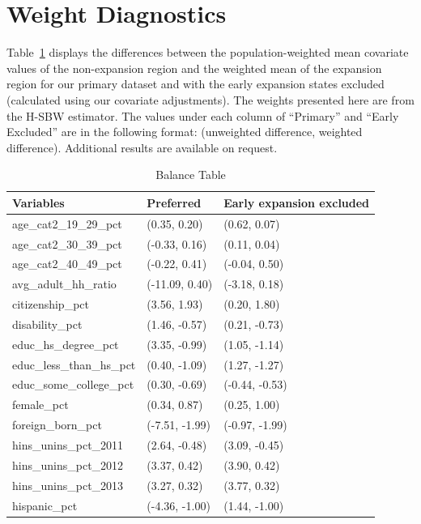 \section{Weight Diagnostics}
\label{ssec:balancetables}

Table~\ref{tab:baltab1} displays the differences between the population-weighted mean covariate values of the non-expansion region and the weighted mean of the expansion region for our primary dataset and with the early expansion states excluded (calculated using our covariate adjustments). The weights presented here are from the H-SBW estimator. The values under each column of ``Primary'' and ``Early Excluded'' are in the following format: (unweighted difference, weighted difference). Additional results are available on request.

\begin{table}[ht]
\centering
    \caption{Balance Table}
    \label{tab:baltab1}
\begin{tabular}{lll}
  \hline
Variables & Preferred & Early expansion excluded \\ 
  \hline
age\_cat2\_19\_29\_pct & (0.35, 0.20) & (0.62, 0.07) \\ 
  age\_cat2\_30\_39\_pct & (-0.33, 0.16) & (0.11, 0.04) \\ 
  age\_cat2\_40\_49\_pct & (-0.22, 0.41) & (-0.04, 0.50) \\ 
  avg\_adult\_hh\_ratio & (-11.09, 0.40) & (-3.18, 0.18) \\ 
  citizenship\_pct & (3.56, 1.93) & (0.20, 1.80) \\ 
  disability\_pct & (1.46, -0.57) & (0.21, -0.73) \\ 
  educ\_hs\_degree\_pct & (3.35, -0.99) & (1.05, -1.14) \\ 
  educ\_less\_than\_hs\_pct & (0.40, -1.09) & (1.27, -1.27) \\ 
  educ\_some\_college\_pct & (0.30, -0.69) & (-0.44, -0.53) \\ 
  female\_pct & (0.34, 0.87) & (0.25, 1.00) \\ 
  foreign\_born\_pct & (-7.51, -1.99) & (-0.97, -1.99) \\ 
  hins\_unins\_pct\_2011 & (2.64, -0.48) & (3.09, -0.45) \\ 
  hins\_unins\_pct\_2012 & (3.37, 0.42) & (3.90, 0.42) \\ 
  hins\_unins\_pct\_2013 & (3.27, 0.32) & (3.77, 0.32) \\ 
  hispanic\_pct & (-4.36, -1.00) & (1.44, -1.00) \\ 

\end{tabular}
\end{table}
